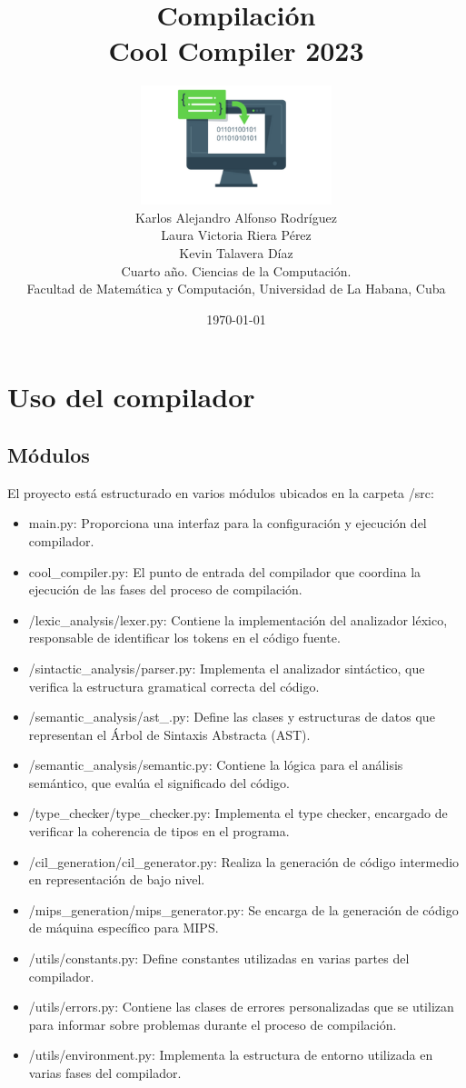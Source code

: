 \documentclass[10pt]{article} %
\title{\normalsize{Compilaci\'on}\\
	\Huge\bfseries Cool Compiler 2023 \\
} %
\author{%
	\includegraphics[width=15em]{logo.png}\\
	Karlos Alejandro Alfonso Rodríguez\\
	Laura Victoria Riera P\'erez\\
	Kevin Talavera Díaz \vspace{1em} \\
	\small Cuarto a\~no. Ciencias de la Computaci\'on. \\ %
	\small Facultad de Matem\'atica y Computaci\'on, Universidad de La Habana, Cuba \\ %
}
\date{\footnotesize \today } %
\begin{document}
	
	
	
	\maketitle
	

	\section{Uso del compilador}
	
	\subsection{M\'odulos}
	
	El proyecto está estructurado en varios módulos ubicados en la carpeta /src:
	
	\begin{itemize}
		\item main.py: Proporciona una interfaz para la configuración y ejecución del compilador.
		\item cool\_compiler.py: El punto de entrada del compilador que coordina la ejecución de las fases del proceso de compilación.
		\item /lexic\_analysis/lexer.py: Contiene la implementación del analizador léxico, responsable de identificar los tokens en el código fuente. 
		\item /sintactic\_analysis/parser.py: Implementa el analizador sintáctico, que verifica la estructura gramatical correcta del código.
		\item /semantic\_analysis/ast\_.py: Define las clases y estructuras de datos que representan el Árbol de Sintaxis Abstracta (AST).
		\item /semantic\_analysis/semantic.py: Contiene la lógica para el análisis semántico, que evalúa el significado del código.
		\item /type\_checker/type\_checker.py: Implementa el type checker, encargado de verificar la coherencia de tipos en el programa.
		\item /cil\_generation/cil\_generator.py: Realiza la generación de código intermedio en representación de bajo nivel.
		\item /mips\_generation/mips\_generator.py: Se encarga de la generación de código de máquina específico para MIPS.
		\item /utils/constants.py: Define constantes utilizadas en varias partes del compilador.
		\item /utils/errors.py: Contiene las clases de errores personalizadas que se utilizan para informar sobre problemas durante el proceso de compilación.
		\item /utils/environment.py: Implementa la estructura de entorno utilizada en varias fases del compilador.
	\end{itemize}
	
\end{document}
